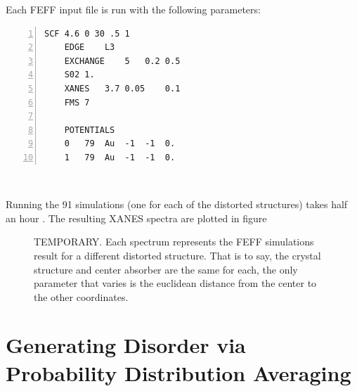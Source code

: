 \begin{minipage}{\linewidth}
Each FEFF input file is run with the following parameters: 
\begin{Verbatim}[samepage=true, numbers=left]
    SCF 4.6 0 30 .5 1
    EDGE    L3
    EXCHANGE    5   0.2 0.5
    S02 1.
    XANES   3.7 0.05    0.1
    FMS 7

    POTENTIALS
    0	79	Au	-1	-1	0.
    1	79	Au	-1	-1	0.
\end{Verbatim}
~
\end{minipage}

Running the 91 simulations (one for each of the distorted structures) takes half an hour . The resulting XANES spectra are plotted in figure 

\begin{figure}[h]
	\centering
	\caption[FEFF Simulations Results]{TEMPORARY. Each spectrum represents the FEFF simulations result for a different distorted structure. That is to say, the crystal structure and center absorber are the same for each, the only parameter that varies is the euclidean distance from the center to the other coordinates.}
	\label{fig:feff-results}
\end{figure}

\section{Generating Disorder via Probability Distribution Averaging}

